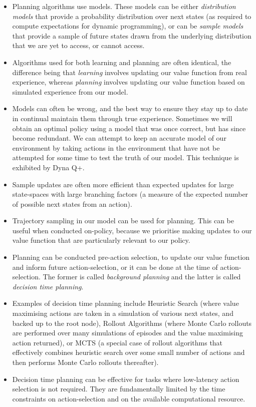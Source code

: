\begin{itemize}
	\item Planning algorithms use models. These models can be either \textit{distribution models} that provide a probability distribution over next states (as required to compute expectations for dynamic programming), or can be \textit{sample models} that provide a sample of future states drawn from the underlying distribution that we are yet to access, or cannot access.
	\item Algorithms used for both learning and planning are often identical, the difference being that \textit{learning} involves updating our value function from real experience, whereas \textit{planning} involves updating our value function based on simulated experience from our model.
	\item Models can often be wrong, and the best way to ensure they stay up to date in continual maintain them through true experience. Sometimes we will obtain an optimal policy using a model that was once correct, but has since become redundant. We can attempt to keep an accurate model of our environment by taking actions in the environment that have not be attempted for some time to test the truth of our model. This technique is exhibited by Dyna Q+.
	\item Sample updates are often more efficient than expected updates for large state-spaces with large branching factors (a measure of the expected number of possible next states from an action).
	\item Trajectory sampling in our model can be used for planning. This can be useful when conducted on-policy, because we prioritise making updates to our value function that are particularly relevant to our policy.
	\item Planning can be conducted pre-action selection, to update our value function and inform future action-selection, or it can be done at the time of action-selection. The former is called \textit{background planning} and the latter is called \textit{decision time planning}.
	\item Examples of decision time planning include Heuristic Search (where value maximising actions are taken in a simulation of various next states, and backed up to the root node), Rollout Algorithms (where Monte Carlo rollouts are performed over many simulations of episodes and the value maximising action returned), or MCTS (a special case of rollout algorithms that effectively combines heuristic search over some small number of actions and then performs Monte Carlo rollouts thereafter).
	\item Decision time planning can be effective for tasks where low-latency action selection is not required. They are fundamentally limited by the time constraints on action-selection and on the available computational resource.
\end{itemize}

